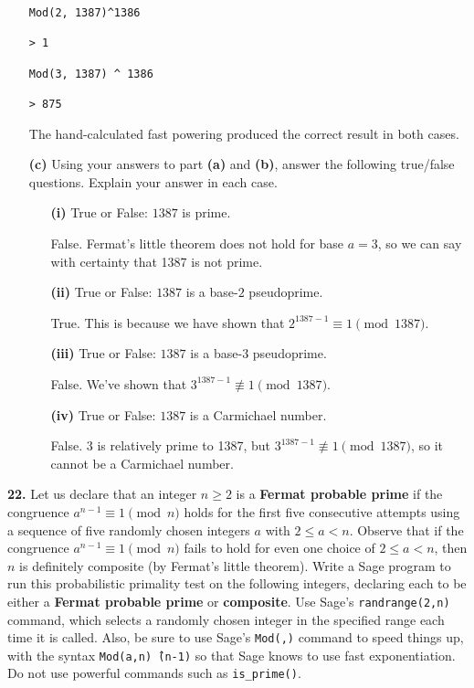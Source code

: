 \documentclass[12pt]{amsart}
\begin{document}
\begin{itemize}
\begin{verbatim}
Mod(2, 1387)^1386

> 1

Mod(3, 1387) ^ 1386

> 875
\end{verbatim}		
	
	The hand-calculated fast powering produced the correct result in both cases.
	
	\item[{\bf (c)}]  Using your answers to part {\bf (a)} and {\bf (b)}, answer the following true/false questions.  Explain your answer in each case.
\begin{itemize}
	\item[{\bf (i)}]  True or False: $1387$ is prime.
	
		\smallskip
		
		False. Fermat's little theorem does not hold for base $a=3$, so we can say with certainty that 1387 is not prime.
		
		\smallskip
	
	\item[{\bf (ii)}]  True or False: $1387$ is a base-$2$ pseudoprime.
	
	\smallskip
	
		True. This is because we have shown that $2^{1387 - 1}\equiv 1\pmod{1387}$.
	
	\smallskip
	
	\item[{\bf (iii)}]  True or False: $1387$ is a base-$3$ pseudoprime.
	
	\smallskip

	False. We've shown that $3^{1387 - 1} \not\equiv 1\pmod{1387}$.
	
	\smallskip
	
	\item[{\bf (iv)}]  True or False: $1387$ is a Carmichael number.
	
	\smallskip
	
	False. 3 is relatively prime to 1387, but $3^{1387 - 1} \not\equiv 1\pmod{1387}$, so it cannot be a Carmichael number.
	
	\smallskip
\end{itemize}
\end{itemize}

\newpage

{\bf 22.}  Let us declare that an integer $n\geq2$ is a {\bf Fermat probable prime} if the congruence $a^{n-1}\equiv1\pmod{n}$ holds for the first five consecutive attempts using a sequence of  five randomly chosen integers $a$ with $2\leq a<n$.  Observe that if the congruence $a^{n-1}\equiv1\pmod{n}$ fails to hold for even one choice of $2\leq a<n$, then $n$ is definitely composite (by Fermat's little theorem).  Write a Sage program to run this probabilistic primality test on the following integers, declaring each to be either a {\bf Fermat probable prime} or {\bf composite}.  Use Sage's {\tt randrange(2,n)} command, which selects a randomly chosen integer in the specified range each time it is called.  Also, be sure to use Sage's {\tt Mod(,)} command to speed things up, with the syntax {\tt Mod(a,n)\^\,(n-1)} so that Sage knows to use fast exponentiation.  Do not use powerful commands such as {\tt is\_prime()}.
\end{document}
